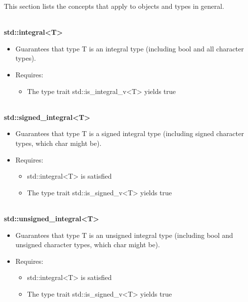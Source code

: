 

This section lists the concepts that apply to objects and types in general.


\noindent
\hspace*{\fill} \\ %
\textbf{std::integral<T>}

\begin{itemize}
\item
Guarantees that type T is an integral type (including bool and all character types).

\item
Requires:
\begin{itemize}
\item
The type trait std::is\_integral\_v<T> yields true
\end{itemize}
\end{itemize}


\noindent
\hspace*{\fill} \\ %
\textbf{std::signed\_integral<T>}

\begin{itemize}
\item
Guarantees that type T is a signed integral type (including signed character types, which char might be).

\item
Requires:
\begin{itemize}
\item
std::integral<T> is satisfied

\item
The type trait std::is\_signed\_v<T> yields true
\end{itemize}
\end{itemize}

\noindent
\hspace*{\fill} \\ %
\textbf{std::unsigned\_integral<T>}

\begin{itemize}
\item
Guarantees that type T is an unsigned integral type (including bool and unsigned character types, which char might be).

\item
Requires:
\begin{itemize}
\item
std::integral<T> is satisfied

\item
The type trait std::is\_signed\_v<T> yields true
\end{itemize}
\end{itemize}

